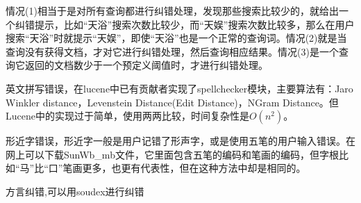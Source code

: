 \par 情况(1)相当于是对所有查询都进行纠错处理，发现那些搜索比较少的，就给出一个纠错提示，比如“天浴”搜索次数比较少，而“天娱”搜索次数比较多，那么在用户搜索“天浴”时就提示“天娱”，即使“天浴”也是一个正常的查询词。情况(2)就是当查询没有获得文档，才对它进行纠错处理，然后查询相应结果。情况(3)是一个查询它返回的文档数少于一个预定义阈值时，才进行纠错处理。
\par 英文拼写错误，在lucene中已有贡献者实现了spellchecker模块，主要算法有：Jaro Winkler distance，Levenstein Distance(Edit Distance)，NGram Distance。但Lucene中的实现过于简单，使用两两比较，时间复杂性是$O(n^2)$。
\par 形近字错误，形近字一般是用户记错了形声字，或是使用五笔的用户输入错误。在网上可以下载SunWb\_mb文件，它里面包含五笔的编码和笔画的编码，但字根比如“马”比“口”笔画更多，也更有代表性，但在这种方法中却是相同的。
\par 方言纠错,可以用soudex进行纠错
